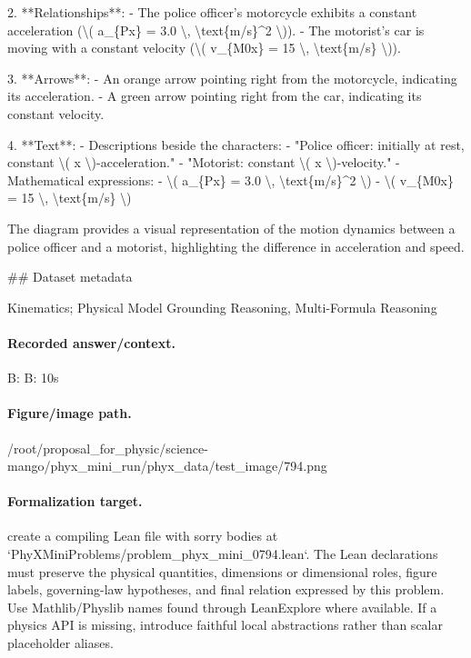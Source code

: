 2. **Relationships**:
   - The police officer's motorcycle exhibits a constant acceleration (\textbackslash{}( a\_\{Px\} = 3.0 \textbackslash{}, \textbackslash{}text\{m/s\}\textasciicircum{}2 \textbackslash{})).
   - The motorist's car is moving with a constant velocity (\textbackslash{}( v\_\{M0x\} = 15 \textbackslash{}, \textbackslash{}text\{m/s\} \textbackslash{})).

3. **Arrows**:
   - An orange arrow pointing right from the motorcycle, indicating its acceleration.
   - A green arrow pointing right from the car, indicating its constant velocity.

4. **Text**:
   - Descriptions beside the characters:
     - "Police officer: initially at rest, constant \textbackslash{}( x \textbackslash{})-acceleration."
     - "Motorist: constant \textbackslash{}( x \textbackslash{})-velocity."
   - Mathematical expressions:
     - \textbackslash{}( a\_\{Px\} = 3.0 \textbackslash{}, \textbackslash{}text\{m/s\}\textasciicircum{}2 \textbackslash{})
     - \textbackslash{}( v\_\{M0x\} = 15 \textbackslash{}, \textbackslash{}text\{m/s\} \textbackslash{})

The diagram provides a visual representation of the motion dynamics between a police officer and a motorist, highlighting the difference in acceleration and speed.

\#\# Dataset metadata

Kinematics; Physical Model Grounding Reasoning, Multi-Formula Reasoning

\paragraph{Recorded answer/context.}
B: B: 10s

\paragraph{Figure/image path.}
/root/proposal\_for\_physic/science-mango/phyx\_mini\_run/phyx\_data/test\_image/794.png

\paragraph{Formalization target.}
create a compiling Lean file with sorry bodies at `PhyXMiniProblems/problem\_phyx\_mini\_0794.lean`. The Lean declarations must preserve the physical quantities, dimensions or dimensional roles, figure labels, governing-law hypotheses, and final relation expressed by this problem.
Use Mathlib/Physlib names found through LeanExplore where available. If a physics API is missing, introduce faithful local abstractions rather than scalar placeholder aliases.

